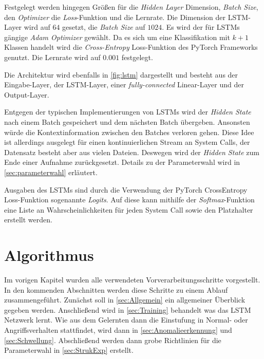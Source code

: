         Festgelegt werden hingegen Größen für die \textit{Hidden Layer} Dimension, \textit{Batch Size}, den \textit{Optimizer} die \textit{Loss}-Funktion und die Lernrate.
        Die Dimension der \ac{LSTM}-Layer wird auf $64$ gesetzt, die \textit{Batch Size} auf $1024$.
        Es wird der für \acp{LSTM} gängige \textit{Adam Optimizer} gewählt.
        Da es sich um eine Klassifikation mit $k+1$ Klassen handelt wird die \textit{Cross-Entropy} Loss-Funktion des PyTorch Frameworks genutzt.
        Die Lernrate wird auf $0.001$ festgelegt.

        Die Architektur wird ebenfalls in \autoref{fig:lstm} dargestellt und besteht aus der Eingabe-Layer, der \ac{LSTM}-Layer, einer \textit{fully-connected} Linear-Layer und der Output-Layer.

        Entgegen der typischen Implementierungen von \acp{LSTM} wird der \textit{Hidden State} nach einem Batch gespeichert und dem nächsten Batch  übergeben. 
        Ansonsten würde die Kontextinformation zwischen den Batches verloren gehen.
        Diese Idee ist allerdings ausgelegt für einen kontinuierlichen Stream an System Calls, der Datensatz besteht aber aus vielen Dateien.
        Deswegen wird der \textit{Hidden State} zum Ende einer Aufnahme zurückgesetzt.
        Details zu der Parameterwahl wird in \autoref{sec:parameterwahl} erläutert.

        Ausgaben des \acp{LSTM} sind durch die Verwendung der PyTorch CrossEntropy Loss-Funktion sogenannte \textit{Logits}.
        Auf diese kann mithilfe der \textit{Softmax}-Funktion eine Liste an Wahrscheinlichkeiten für jeden System Call sowie den Platzhalter erstellt werden.

    \section{Algorithmus}\label{sec:Algorithmus}
        Im vorigen Kapitel wurden alle verwendeten Vorverarbeitungsschritte vorgestellt.
        In den kommenden Abschnitten werden diese Schritte zu einem Ablauf zusammengeführt.
        Zunächst soll in \autoref{sec:Allgemein} ein allgemeiner Überblick gegeben werden.
        Anschließend wird in \autoref{sec:Training} behandelt was das \ac{LSTM} Netzwerk lernt.
        Wie aus dem Gelernten dann die Einstufung in Normal- oder Angriffsverhalten stattfindet, wird dann in \autoref{sec:Anomalieerkennung} und \autoref{sec:Schwellung}.
        Abschließend werden dann grobe Richtlinien für die Parameterwahl in \autoref{sec:StrukExp} erstellt.

